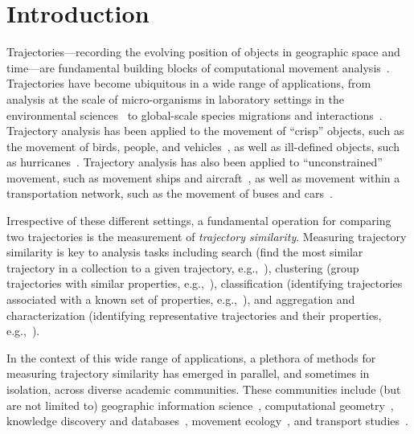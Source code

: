 \documentclass{interact}
\begin{document}
\section{Introduction}
Trajectories---recording the evolving position of objects in geographic space and time---are fundamental building blocks of computational movement analysis~\citep{DBLP:series/sbcs/Laube14}. Trajectories have become ubiquitous in a wide range of applications, from analysis at the scale of micro-organisms in laboratory settings in the environmental sciences~\citep{nathan_movement_2008} to global-scale species migrations and interactions~\citep{horne_analyzing_2007,andersson_reporting_2008}. Trajectory analysis has been applied to the movement of ``crisp'' objects, such as the movement of birds, people, and vehicles~\citep{fritz_scaledependent_2003,gonzalez_understanding_2008,arslan2019semantic,liu_understanding_2012}, as well as ill-defined objects, such as hurricanes~\citep{dodge_movement_2012}. Trajectory analysis has also been applied to ``unconstrained'' movement, such as movement ships and aircraft~\citep{kaluza_complex_2010,varlamis2019network}, as well as movement within a transportation network, such as the movement of buses and cars~\citep{tao_analytics_2017,gong2019extracting}.

Irrespective of these different settings, a fundamental operation for comparing two trajectories is the measurement of \emph{trajectory similarity}. Measuring trajectory similarity is key to analysis tasks including search (find the most similar trajectory in a collection to a given trajectory, e.g.,~\citealp{DBLP:journals/comgeo/BuchinBKL11}), clustering (group trajectories with similar properties, e.g.,~\citealp{DBLP:conf/icpr/ZhangHT06}), classification (identifying trajectories associated with a known set of properties, e.g.,~\citealp{DBLP:journals/tip/BashirKS07}), and aggregation and characterization (identifying representative trajectories and their properties, e.g.,~\citealp{DBLP:journals/algorithmica/BuchinBKLSWW13}).

In the context of this wide range of applications, a plethora of methods for measuring trajectory similarity has emerged in parallel, and sometimes in isolation, across diverse academic communities. These communities include (but are not limited to) geographic information science~\citep{DBLP:journals/gis/DodgeLW12,petry2019towards}, computational geometry~\citep{DBLP:journals/comgeo/BuchinBKL11}, knowledge discovery and databases~\citep{DBLP:conf/time/PelekisKMNAT07}, movement ecology~\citep{demvsar2015analysis}, and transport studies~\citep{DBLP:journals/tits/ZhangWWLXC11}. 
\end{document}
